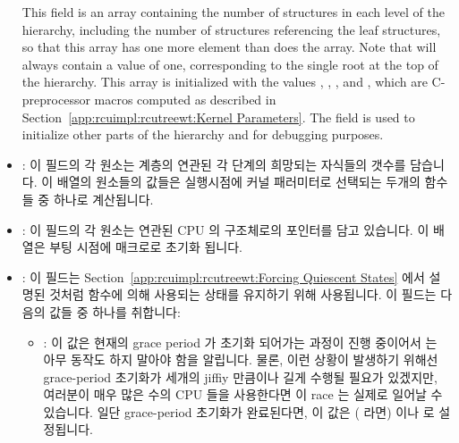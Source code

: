 \begin{itemize}
	This field is an array containing the number of 
	structures in each level of the hierarchy, including the
	number of  structures referencing the leaf
	 structures, so that this array has one more
	element than does the  array.
	Note that  will always contain a value of
	one, corresponding to the single root  at the
	top of the hierarchy.
	This array is initialized with the values
	,
	,
	, and
	,
	which are C-preprocessor macros computed as described in
	Section~\ref{app:rcuimpl:rcutreewt:Kernel Parameters}.
	The  field is used to initialize
	other parts of the hierarchy and for debugging purposes.
	\fi
\item	{}:
	이 필드의 각 원소는  계층의 연관된 각 단계의 희망되는
	자식들의 갯수를 담습니다.
	이 배열의 원소들의 값들은 실행시점에  커널
	패러미터로 선택되는 두개의  함수들 중 하나로
	계산됩니다.
	\iffalse

	Each element of this field contains the desired number of children
	for the corresponding level of the \co{rcu_node} hierarchy.
	This array's element's values are computed at runtime
	by one of the two \co{rcu_init_levelspread()} functions,
	selected by the \co{CONFIG_RCU_FANOUT_EXACT} kernel parameter.
	\fi
\item	{}:
	이 필드의 각 원소는 연관된 CPU 의  구조체로의 포인터를
	담고 있습니다.
	이 배열은 부팅 시점에  매크로로 초기화 됩니다.
	\iffalse

	Each element of this field contains a pointer to the
	corresponding CPU's \co{rcu_data} structure.
	This array is initialized at boot time by the
	\co{RCU_DATA_PTR_INIT()} macro.
	\fi
\item	{}:
	이 필드는
	Section~\ref{app:rcuimpl:rcutreewt:Forcing Quiescent States} 에서
	설명된 것처럼  함수에 의해 사용되는 상태를
	유지하기 위해 사용됩니다.
	이 필드는 다음의 값들 중 하나를 취합니다:
	\iffalse

	This field is used to maintain state used by the
	\co{force_quiescent_state()} function, as described in
	Section~\ref{app:rcuimpl:rcutreewt:Forcing Quiescent States}.
	This field takes on values as follows:
	\fi
	\begin{itemize}
	\item	{}:
		이 값은 현재의 grace period 가 초기화 되어가는 과정이 진행
		중이어서  는 아무 동작도 하지
		말아야 함을 알립니다.
		물론, 이런 상황이 발생하기 위해선 grace-period 초기화가 세개의
		jiffiy 만큼이나 길게 수행될 필요가 있겠지만, 여러분이 매우 많은
		수의 CPU 들을 사용한다면 이 race 는 실제로 일어날 수 있습니다.
		일단 grace-period 초기화가 완료된다면, 이 값은
		( 라면)  이나
		 로 설정됩니다.
		\iffalse


\end{itemize}
\end{itemize}
